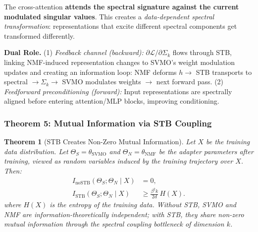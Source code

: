 \documentclass{scpe}
\newtheorem{theorem}{Theorem}[section]
\begin{document}
The cross-attention \textbf{attends the spectral signature against the current modulated singular values}. This creates a \textit{data-dependent spectral transformation}: representations that excite different spectral components get transformed differently.

\textbf{Dual Role.} (1) \textit{Feedback channel (backward):} $\partial\mathcal{L}/\partial\Sigma_k$ flows through STB, linking NMF-induced representation changes to SVMO's weight modulation updates and creating an information loop: NMF deforms $h \to$ STB transports to spectral $\to \Sigma_k \to$ SVMO modulates weights $\to$ next forward pass. (2) \textit{Feedforward preconditioning (forward):} Input representations are spectrally aligned before entering attention/MLP blocks, improving conditioning.

\subsubsection{Theorem 5: Mutual Information via STB Coupling}

\begin{theorem}[STB Creates Non-Zero Mutual Information]
\label{thm:stb-mi}
Let $X$ be the training data distribution. Let $\Theta_S = \theta_{\text{SVMO}}$ and $\Theta_N = \theta_{\text{NMF}}$ be the adapter parameters after training, viewed as random variables induced by the training trajectory over $X$. Then:
\begin{align}
I_{\mathrm{no\!STB}}(\Theta_S; \Theta_N \mid X) &= 0, \label{eq:no-stb-mi}\\
I_{\mathrm{STB}}(\Theta_S; \Theta_N \mid X) &\geq \frac{\beta^2 k}{2d}\,H(X). \label{eq:stb-mi}
\end{align}
where $H(X)$ is the entropy of the training data. Without STB, SVMO and NMF are information-theoretically independent; with STB, they share non-zero mutual information through the spectral coupling bottleneck of dimension $k$.
\end{theorem}
\end{document}
